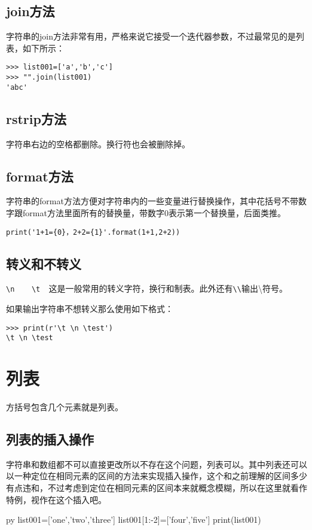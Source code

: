 \documentclass[12pt,oneside]{book}
\begin{document}
\begin{common-format}
\subsection{join方法}
字符串的join方法非常有用，严格来说它接受一个迭代器参数，不过最常见的是列表，如下所示：
\begin{Verbatim}
>>> list001=['a','b','c']
>>> "".join(list001)
'abc'
\end{Verbatim}



\subsection{rstrip方法}
字符串右边的空格都删除。换行符也会被删除掉。

\subsection{format方法}
字符串的format方法方便对字符串内的一些变量进行替换操作，其中花括号不带数字跟format方法里面所有的替换量，带数字0表示第一个替换量，后面类推。
\begin{Verbatim}
print('1+1={0}，2+2={1}'.format(1+1,2+2))
\end{Verbatim}

\subsection{转义和不转义}
\verb+\n    \t  +这是一般常用的转义字符，换行和制表。此外还有\verb+\\+输出\textbackslash 符号。

如果输出字符串不想转义那么使用如下格式：
\begin{Verbatim}
>>> print(r'\t \n \test')
\t \n \test
\end{Verbatim}





\section{列表}
方括号包含几个元素就是列表。


\subsection{列表的插入操作}
\label{sec:列表插入操作}
字符串和数组都不可以直接更改所以不存在这个问题，列表可以。其中列表还可以以一种定位在相同元素的区间的方法来实现插入操作，这个和之前理解的区间多少有点违和，不过考虑到定位在相同元素的区间本来就概念模糊，所以在这里就看作特例，视作在这个插入吧。
\begin{xverbatim}[129]{py}
list001=['one','two','three']
list001[1:-2]=['four','five']
print(list001)
\end{xverbatim}


\end{common-format}
\end{document}
